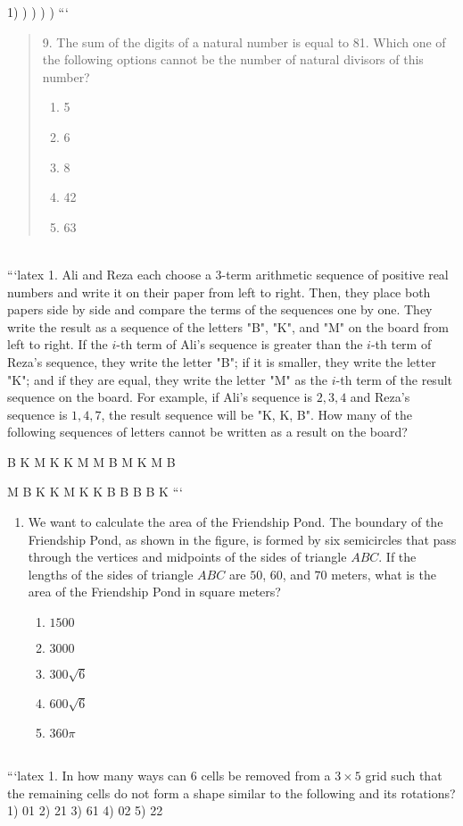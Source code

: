 1)  )  )  )  ) 
```
\\
\begin{quote}
9. The sum of the digits of a natural number is equal to 81. Which one of the following options cannot be the number of natural divisors of this number? 
\begin{enumerate}
    \item 5
    \item 6
    \item 8
    \item 42
    \item 63
\end{enumerate}
\end{quote}
\\
```latex
1. Ali and Reza each choose a 3-term arithmetic sequence of positive real numbers and write it on their paper from left to right. Then, they place both papers side by side and compare the terms of the sequences one by one. They write the result as a sequence of the letters "B", "K", and "M" on the board from left to right. If the \(i\)-th term of Ali's sequence is greater than the \(i\)-th term of Reza's sequence, they write the letter "B"; if it is smaller, they write the letter "K"; and if they are equal, they write the letter "M" as the \(i\)-th term of the result sequence on the board. For example, if Ali's sequence is \(2, 3, 4\) and Reza's sequence is \(1, 4, 7\), the result sequence will be "K, K, B". How many of the following sequences of letters cannot be written as a result on the board?

B K M K K M M B M K M B

M B K K M K K B B B B K
```
\\
\begin{enumerate}
    \item We want to calculate the area of the Friendship Pond. The boundary of the Friendship Pond, as shown in the figure, is formed by six semicircles that pass through the vertices and midpoints of the sides of triangle $ABC$. If the lengths of the sides of triangle $ABC$ are $50$, $60$, and $70$ meters, what is the area of the Friendship Pond in square meters?
    \begin{enumerate}
        \item $1500$
        \item $3000$
        \item $300\sqrt{6}$
        \item $600\sqrt{6}$
        \item $360\pi$
    \end{enumerate}
\end{enumerate}
\\
```latex
1. In how many ways can 6 cells be removed from a $3 \times 5$ grid such that the remaining cells do not form a shape similar to the following and its rotations? 
1) 01  2) 21  3) 61  4) 02  5) 22

